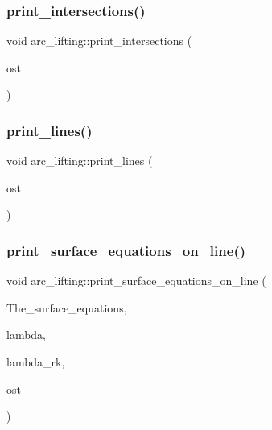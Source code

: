 \mbox{\label{classarc__lifting_a56673f5d1a85379718d680a8577890ef}} 
\subsubsection{\texorpdfstring{print\+\_\+intersections()}{print\_intersections()}}
{\footnotesize\ttfamily void arc\+\_\+lifting\+::print\+\_\+intersections (\begin{DoxyParamCaption}\item[{ostream \&}]{ost }\end{DoxyParamCaption})}

\mbox{\label{classarc__lifting_a009bcb8a7affe10703e00d89989d69ab}} 
\subsubsection{\texorpdfstring{print\+\_\+lines()}{print\_lines()}}
{\footnotesize\ttfamily void arc\+\_\+lifting\+::print\+\_\+lines (\begin{DoxyParamCaption}\item[{ostream \&}]{ost }\end{DoxyParamCaption})}

\mbox{\label{classarc__lifting_aba18024c35f7c17c3d0d113a85d82ada}} 
\subsubsection{\texorpdfstring{print\+\_\+surface\+\_\+equations\+\_\+on\+\_\+line()}{print\_surface\_equations\_on\_line()}}
{\footnotesize\ttfamily void arc\+\_\+lifting\+::print\+\_\+surface\+\_\+equations\+\_\+on\+\_\+line (\begin{DoxyParamCaption}\item[{\mbox{\hyperlink{galois_8h_a09fddde158a3a20bd2dcadb609de11dc}{I\+NT}} $\ast$}]{The\+\_\+surface\+\_\+equations,  }\item[{\mbox{\hyperlink{galois_8h_a09fddde158a3a20bd2dcadb609de11dc}{I\+NT}}}]{lambda,  }\item[{\mbox{\hyperlink{galois_8h_a09fddde158a3a20bd2dcadb609de11dc}{I\+NT}}}]{lambda\+\_\+rk,  }\item[{ostream \&}]{ost }\end{DoxyParamCaption})}

